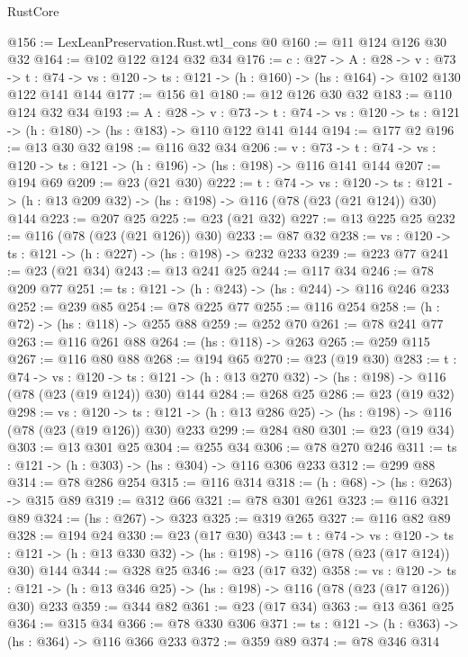 \begin{lexlean}{RustCore}
\begin{coremodule}
@156 := LexLeanPreservation.Rust.wtl_cons @0
@160 := @11 @124 @126 @30 @32
@164 := @102 @122 @124 @32 @34
@176 := {c : @27} ->
  {A : @28} ->
  {v : @73} ->
  {t : @74} -> {vs : @120} -> {ts : @121} -> (h : @160) -> (hs : @164) -> @102 @130 @122 @141 @144
@177 := @156 @1
@180 := @12 @126 @30 @32
@183 := @110 @124 @32 @34
@193 := {A : @28} ->
  {v : @73} ->
  {t : @74} -> {vs : @120} -> {ts : @121} -> (h : @180) -> (hs : @183) -> @110 @122 @141 @144
@194 := @177 @2
@196 := @13 @30 @32
@198 := @116 @32 @34
@206 := {v : @73} ->
  {t : @74} -> {vs : @120} -> {ts : @121} -> (h : @196) -> (hs : @198) -> @116 @141 @144
@207 := @194 @69
@209 := @23 (@21 @30)
@222 := {t : @74} ->
  {vs : @120} ->
  {ts : @121} -> (h : @13 @209 @32) -> (hs : @198) -> @116 (@78 (@23 (@21 @124)) @30) @144
@223 := @207 @25
@225 := @23 (@21 @32)
@227 := @13 @225 @25
@232 := @116 (@78 (@23 (@21 @126)) @30)
@233 := @87 @32
@238 := {vs : @120} -> {ts : @121} -> (h : @227) -> (hs : @198) -> @232 @233
@239 := @223 @77
@241 := @23 (@21 @34)
@243 := @13 @241 @25
@244 := @117 @34
@246 := @78 @209 @77
@251 := {ts : @121} -> (h : @243) -> (hs : @244) -> @116 @246 @233
@252 := @239 @85
@254 := @78 @225 @77
@255 := @116 @254
@258 := (h : @72) -> (hs : @118) -> @255 @88
@259 := @252 @70
@261 := @78 @241 @77
@263 := @116 @261 @88
@264 := (hs : @118) -> @263
@265 := @259 @115
@267 := @116 @80 @88
@268 := @194 @65
@270 := @23 (@19 @30)
@283 := {t : @74} ->
  {vs : @120} ->
  {ts : @121} -> (h : @13 @270 @32) -> (hs : @198) -> @116 (@78 (@23 (@19 @124)) @30) @144
@284 := @268 @25
@286 := @23 (@19 @32)
@298 := {vs : @120} ->
  {ts : @121} -> (h : @13 @286 @25) -> (hs : @198) -> @116 (@78 (@23 (@19 @126)) @30) @233
@299 := @284 @80
@301 := @23 (@19 @34)
@303 := @13 @301 @25
@304 := @255 @34
@306 := @78 @270 @246
@311 := {ts : @121} -> (h : @303) -> (hs : @304) -> @116 @306 @233
@312 := @299 @88
@314 := @78 @286 @254
@315 := @116 @314
@318 := (h : @68) -> (hs : @263) -> @315 @89
@319 := @312 @66
@321 := @78 @301 @261
@323 := @116 @321 @89
@324 := (hs : @267) -> @323
@325 := @319 @265
@327 := @116 @82 @89
@328 := @194 @24
@330 := @23 (@17 @30)
@343 := {t : @74} ->
  {vs : @120} ->
  {ts : @121} -> (h : @13 @330 @32) -> (hs : @198) -> @116 (@78 (@23 (@17 @124)) @30) @144
@344 := @328 @25
@346 := @23 (@17 @32)
@358 := {vs : @120} ->
  {ts : @121} -> (h : @13 @346 @25) -> (hs : @198) -> @116 (@78 (@23 (@17 @126)) @30) @233
@359 := @344 @82
@361 := @23 (@17 @34)
@363 := @13 @361 @25
@364 := @315 @34
@366 := @78 @330 @306
@371 := {ts : @121} -> (h : @363) -> (hs : @364) -> @116 @366 @233
@372 := @359 @89
@374 := @78 @346 @314

\end{coremodule}
\end{lexlean}
